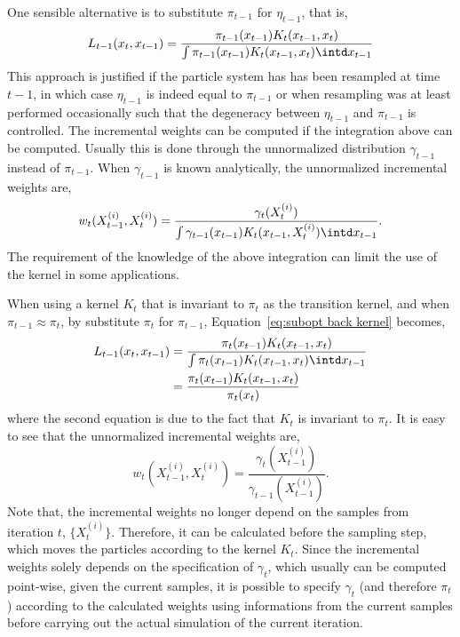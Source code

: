 One sensible alternative is to substitute $\pi_{t-1}$ for $\eta_{t-1}$, that
is,
\begin{equation}
  L_{t-1}(x_t,x_{t-1}) =
  \frac{\pi_{t-1}(x_{t-1})K_t(x_{t-1},x_t)}
  {\int \pi_{t-1}(x_{t-1})K_t(x_{t-1},x_t)\intd x_{t-1}}
  \label{eq:subopt back kernel}
\end{equation}
This approach is justified if the particle system has has been resampled at
time $t-1$, in which case $\eta_{t-1}$ is indeed equal to $\pi_{t-1}$ or when
resampling was at least performed occasionally such that the degeneracy
between $\eta_{t-1}$ and $\pi_{t-1}$ is controlled. The incremental weights
can be computed if the integration above can be computed. Usually this is done
through the unnormalized distribution $\gamma_{t-1}$ instead of $\pi_{t-1}$.
When $\gamma_{t-1}$ is known analytically, the unnormalized incremental
weights are,
\begin{equation}
  w_t(X_{t-1}^{(i)},X_t^{(i)}) =
  \frac{\gamma_t(X_t^{(i)})}
  {\int\gamma_{t-1}(x_{t-1})K_t(x_{t-1},X_t^{(i)})\intd x_{t-1}}.
  \label{eq:inc weight subopt}
\end{equation}
The requirement of the knowledge of the above integration can limit the use of
the kernel in some applications.

When using a \mcmc kernel $K_t$ that is invariant to $\pi_t$ as the
transition kernel, and when $\pi_{t-1}\approx\pi_t$, by substitute $\pi_t$
for $\pi_{t-1}$, Equation~\eqref{eq:subopt back kernel} becomes,
\begin{align}
  L_{t-1}(x_t,x_{t-1})
  &= \frac{\pi_t(x_{t-1})K_t(x_{t-1},x_t)}
  {\int \pi_t(x_{t-1})K_t(x_{t-1},x_t)\intd x_{t-1}} \notag\\
  &= \frac{\pi_t(x_{t-1})K_t(x_{t-1},x_t)}{\pi_t(x_t)}
  \label{eq:subopt back kernel mcmc}
\end{align}
where the second equation is due to the fact that $K_t$ is invariant to
$\pi_t$. It is easy to see that the unnormalized incremental weights are,
\begin{equation}
  w_t(X_{t-1}^{(i)},X_t^{(i)}) =
  \frac{\gamma_t(X_{t-1}^{(i)})}{\gamma_{t-1}(X_{t-1}^{(i)})}.
  \label{eq:inc weight subopt mcmc}
\end{equation}
Note that, the incremental weights no longer depend on the samples from
iteration $t$, $\{X_t^{(i)}\}$. Therefore, it can be calculated before the
sampling step, which moves the particles according to the kernel $K_t$. Since
the incremental weights solely depends on the specification of $\gamma_t$,
which usually can be computed point-wise, given the current samples, it is
possible to specify $\gamma_t$ (and therefore $\pi_t$) according to the
calculated weights using informations from the current samples before carrying
out the actual simulation of the current iteration.

